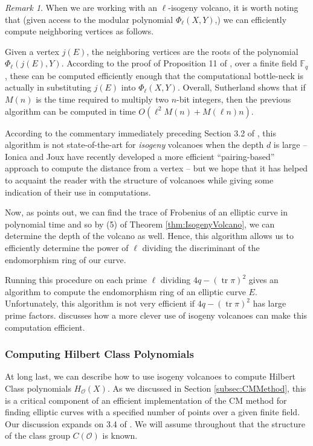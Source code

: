 \documentclass{amsart}
\theoremstyle{definition}
\theoremstyle{remark}
\newtheorem{remark}[thm]{Remark}
\numberwithin{equation}{section}
\newcommand{\cO}{\mathcal O}
\newcommand{\bbF}{\mathbb F}
\DeclareMathOperator{\tr}{tr}
\begin{document}
\begin{remark}
When we are working with an $\ell$-isogeny volcano, it is worth noting that (given access to the modular polynomial $\Phi_{\ell}(X,Y)$,) we can efficiently compute neighboring vertices as follows. 

Given a vertex $j(E)$, the neighboring vertices are the roots of the polynomial $\Phi_{\ell}(j(E), Y)$. According to the proof of Proposition 11 of \cite{SutherlandIV}, over a finite field $\bbF_{q}$, these can be computed efficiently enough that the computational bottle-neck is actually in substituting $j(E)$ into $\Phi_{\ell}(X, Y)$. Overall, Sutherland shows that if $M(n)$ is the time required to multiply two $n$-bit integers, then the previous algorithm can be computed in time $O(\ell^2 M(n) + M(\ell n) n)$. 

According to the commentary immediately preceding Section 3.2 of \cite{SutherlandIV}, this algorithm is not state-of-the-art for \emph{isogeny} volcanoes when the depth $d$ is large -- Ionica and Joux have recently developed a more efficient ``pairing-based'' approach to compute the distance from a vertex -- but we hope that it has helped to acquaint the reader with the structure of volcanoes while giving some indication of their use in computations. 

Now, as \cite{SutherlandIV} points out, we can find the trace of Frobenius of an elliptic curve in polynomial time and so by (5) of Theorem \ref{thm:IsogenyVolcano}, we can determine the depth of the volcano as well. Hence, this algorithm allows us to efficiently determine the power of $\ell$ dividing the discriminant of the endomorphism ring of our curve.

Running this procedure on each prime $\ell$ dividing $4q - (\tr \pi)^2$ gives an algorithm to compute the endomorphism ring of an elliptic curve $E$. Unfortunately, this algorithm is not very efficient if $4q - (\tr \pi)^2$ has large prime factors. \cite{SutherlandIV} discusses how a more clever use of isogeny volcanoes can make this computation efficient.
\end{remark}

\subsubsection{Computing Hilbert Class Polynomials} \label{subsubsec:ComputingHilbertPolys}

At long last, we can describe how to use isogeny volcanoes to compute Hilbert Class polynomials $H_{\cO}(X)$. As we discussed in Section \ref{subsec:CMMethod}, this is a critical component of an efficient implementation of the CM method for finding elliptic curves with a specified number of points over a given finite field. Our discussion expands on 3.4 of \cite{SutherlandIV}. We will assume throughout that the structure of the class group $C(\cO)$ is known.
\end{document}
